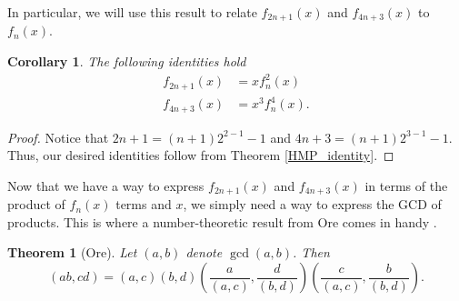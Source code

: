 \documentclass[a4paper]{article}
\newtheorem{theorem}{Theorem}
\newtheorem{corollary}{Corollary}
\begin{document}
	In particular, we will use this result to relate $f_{2n+1}(x)$ and $f_{4n+3}(x)$ to $f_n(x)$.
	\begin{corollary}\label{cor1}
		The following identities hold
		\begin{align*}
			f_{2n+1}(x) &= xf_{n}^2(x) \\
			f_{4n+3}(x) &= x^3f_{n}^4(x).
		\end{align*}
	\end{corollary}
	\begin{proof}
		Notice that $2n+1 = (n+1)2^{2-1} - 1$ and $4n+3 = (n+1)2^{3-1} - 1$.
		Thus, our desired identities follow from Theorem \ref{HMP_identity}.
	\end{proof}

	Now that we have a way to express $f_{2n+1}(x)$ and $f_{4n+3}(x)$ in terms of the product of $f_{n}(x)$ terms and $x$, we simply need a way to express the GCD of products.
	This is where a number-theoretic result from Ore comes in handy \cite{ore_number_theory}.
	
	\begin{theorem}[Ore]\label{Ore_gcd}
		Let $(a,b)$ denote $\gcd{(a,b)}$.
		Then
		\begin{equation*}
			(ab,cd) = (a,c)(b,d)\left(\frac{a}{(a,c)},\frac{d}{(b,d)}\right)\left(\frac{c}{(a,c)},\frac{b}{(b,d)}\right).
		\end{equation*}
	\end{theorem}
\end{document}
